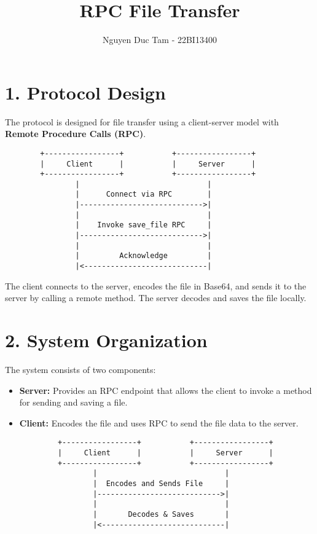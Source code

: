 \documentclass[12pt]{article}
\title{RPC File Transfer}
\author{Nguyen Duc Tam - 22BI13400}
\date{}
\begin{document}
\maketitle

\section*{1. Protocol Design}

The protocol is designed for file transfer using a client-server model with \textbf{Remote Procedure Calls (RPC)}.

\begin{verbatim}
        +-----------------+           +-----------------+
        |     Client      |           |     Server      |
        +-----------------+           +-----------------+
                |                             |
                |      Connect via RPC        |
                |---------------------------->|
                |                             |
                |    Invoke save_file RPC     |
                |---------------------------->|
                |                             |
                |         Acknowledge         |
                |<----------------------------|
\end{verbatim}

The client connects to the server, encodes the file in Base64, and sends it to the server by calling a remote method. The server decodes and saves the file locally.

\section*{2. System Organization}

The system consists of two components:
\begin{itemize}
    \item \textbf{Server:} Provides an RPC endpoint that allows the client to invoke a method for sending and saving a file.
    \item \textbf{Client:} Encodes the file and uses RPC to send the file data to the server.
\end{itemize}

\begin{verbatim}
            +-----------------+           +-----------------+
            |     Client      |           |     Server      |
            +-----------------+           +-----------------+
                    |                             |
                    |  Encodes and Sends File     |
                    |---------------------------->|
                    |                             |
                    |       Decodes & Saves       |
                    |<----------------------------|
\end{verbatim}
\end{document}
